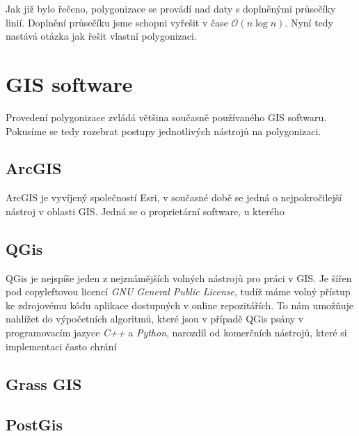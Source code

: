 Jak již bylo řečeno, polygonizace se provádí nad daty s doplněnými průsečíky linií. Doplnění průsečíku jsme schopni vyřešit v čase $\mathcal{O}(n\log{}n)$. Nyní tedy nastává otázka jak řešit vlastní polygonizaci.


\section{GIS software}
Provedení polygonizace zvládá většina současně používaného GIS softwaru. Pokusíme se tedy rozebrat postupy jednotlivých nástrojů na polygonizaci.

\subsection{ArcGIS}
ArcGIS je vyvíjený společností Esri, v současné době se jedná o nejpokročilejší nástroj v oblasti GIS. Jedná se o proprietární software, u kterého 


\subsection{QGis}
QGis je nejspíše jeden z nejznámějších volných nástrojů pro práci v GIS. Je šířen pod copyleftovou  licencí \textit{GNU General Public License}, tudíž máme volný přístup ke zdrojovému kódu aplikace dostupných v online repozitářích. To nám umožňuje nahlížet do výpočetních algoritmů, které jsou v případě QGis psány v programovacím jazyce \textit{C++} a \textit{Python}, narozdíl od komerčních nástrojů, které si implementaci často chrání

\subsection{Grass GIS}

\subsection{PostGis}

